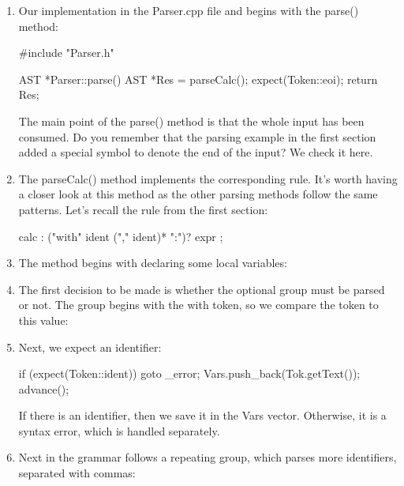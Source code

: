 \begin{enumerate}
\item
Our implementation in the Parser.cpp file and begins with the parse() method:
\begin{cpp}
#include "Parser.h"

AST *Parser::parse() {
    AST *Res = parseCalc();
    expect(Token::eoi);
    return Res;
}
\end{cpp}

The main point of the parse() method is that the whole input has been consumed. Do you remember that the parsing example in the first section added a special symbol to denote the end of the input? We check it here.

\item
The parseCalc() method implements the corresponding rule. It’s worth having a closer look at this method as the other parsing methods follow the same patterns. Let’s recall the rule from the first section:

\begin{cpp}
calc : ("with" ident ("," ident)* ":")? expr ;
\end{cpp}

\item
The method begins with declaring some local variables:

\begin{cpp}
AST *Parser::parseCalc() {
    Expr *E;
    llvm::SmallVector<llvm::StringRef, 8> Vars;
\end{cpp}

\item
The first decision to be made is whether the optional group must be parsed or not. The group begins with the with token, so we compare the token to this value:

\begin{cpp}
if (Tok.is(Token::KW_with)) {
    advance();
\end{cpp}

\item
Next, we expect an identifier:

\begin{cpp}
    if (expect(Token::ident))
        goto _error;
    Vars.push_back(Tok.getText());
    advance();
\end{cpp}

If there is an identifier, then we save it in the Vars vector. Otherwise, it is a syntax error, which is handled separately.

\item
Next in the grammar follows a repeating group, which parses more identifiers, separated with commas:


\end{enumerate}
